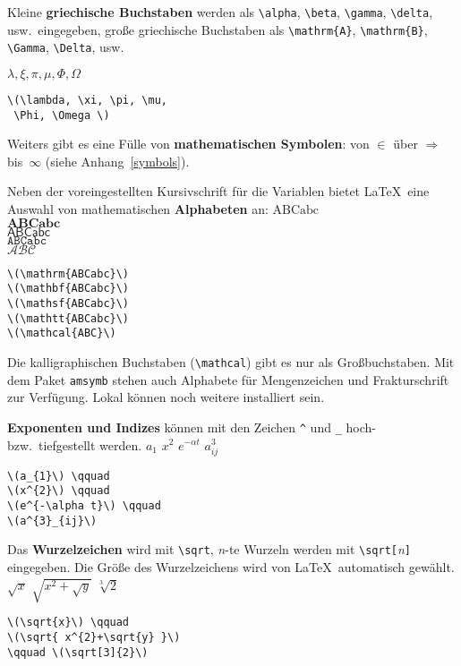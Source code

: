 Kleine \textbf{griechische Buchstaben} werden als \lstinline|\alpha|,
\lstinline|\beta|, \lstinline|\gamma|, \lstinline|\delta|, usw.\ eingegeben,
große griechische Buchstaben als \lstinline|\mathrm{A}|,
\lstinline|\mathrm{B}|, \lstinline|\Gamma|, \lstinline|\Delta|, usw.

\exa
\(\lambda, \xi, \pi, \mu,
 \Phi, \Omega \)
\exb
\begin{verbatim}
\(\lambda, \xi, \pi, \mu,
 \Phi, \Omega \)
\end{verbatim}
\exc
 
Weiters gibt es eine Fülle von \textbf{mathematischen Symbolen}:
von \(\in\) über \(\Rightarrow\) bis~\(\infty\) (siehe
Anhang~\vref{symbols}).
 
\bigskip

Neben der voreingestellten Kursivschrift für die Variablen
bietet \LaTeX\ eine Auswahl von mathematischen \textbf{Alphabeten} an:
\exa
\(\mathrm{ABCabc}\) \\
\(\mathbf{ABCabc}\) \\
\(\mathsf{ABCabc}\) \\
\(\mathtt{ABCabc}\) \\
\(\mathcal{ABC}\)
\exb
\begin{verbatim}
\(\mathrm{ABCabc}\)
\(\mathbf{ABCabc}\)
\(\mathsf{ABCabc}\)
\(\mathtt{ABCabc}\)
\(\mathcal{ABC}\)
\end{verbatim}
\exc
Die kalligraphischen Buchstaben (\lstinline:\mathcal:) gibt es nur als
Großbuchstaben. Mit dem Paket \texttt{amsymb} \cite{ch8} stehen
auch Alphabete für Mengenzeichen und Frakturschrift zur Verfügung.
Lokal können noch weitere installiert sein.


\bigskip

\textbf{Exponenten und Indizes} können mit den Zeichen \lstinline|^|
und \lstinline|_| hoch- bzw.\ tiefgestellt werden.
\exa
\(a_{1}\) \qquad
\(x^{2}\) \qquad
\(e^{-\alpha t}\) \qquad
\(a^{3}_{ij}\)
\exb
\begin{verbatim}
\(a_{1}\) \qquad
\(x^{2}\) \qquad
\(e^{-\alpha t}\) \qquad
\(a^{3}_{ij}\)
\end{verbatim}
\exc
 
Das \textbf{Wurzelzeichen} wird mit \lstinline|\sqrt|, \textit{n}-te
Wurzeln werden mit \lstinline|\sqrt[|\textit{n}\lstinline|]| eingegeben.
Die Größe des Wurzelzeichens wird von \LaTeX\ automatisch
gewählt.
\exa
\(\sqrt{x}\) \qquad
\(\sqrt{ x^{2}+\sqrt{y} }\)
\qquad \(\sqrt[3]{2}\)
\exb
\begin{verbatim}
\(\sqrt{x}\) \qquad
\(\sqrt{ x^{2}+\sqrt{y} }\)
\qquad \(\sqrt[3]{2}\)
\end{verbatim}
\exc
 
